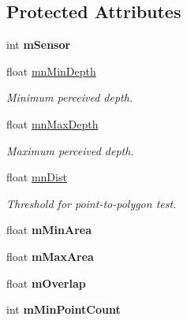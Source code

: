 \subsection*{Protected Attributes}
\begin{DoxyCompactItemize}
\item 
\mbox{\label{classEngine_a32fcfaf08165cdfc81d39e8dc8d71e6f}} 
int {\bfseries m\+Sensor}
\item 
\mbox{\label{classEngine_a7c6071c21007bd703040b035f4262da8}} 
float \hyperlink{classEngine_a7c6071c21007bd703040b035f4262da8}{mn\+Min\+Depth}
\begin{DoxyCompactList}\small\item\em Minimum perceived depth. \end{DoxyCompactList}\item 
\mbox{\label{classEngine_a639e031e36ea33902eee3bf4f2c4600f}} 
float \hyperlink{classEngine_a639e031e36ea33902eee3bf4f2c4600f}{mn\+Max\+Depth}
\begin{DoxyCompactList}\small\item\em Maximum perceived depth. \end{DoxyCompactList}\item 
\mbox{\label{classEngine_a1b1b9bc3ce76e792ae67818a36bd01bd}} 
float \hyperlink{classEngine_a1b1b9bc3ce76e792ae67818a36bd01bd}{mn\+Dist}
\begin{DoxyCompactList}\small\item\em Threshold for point-\/to-\/polygon test. \end{DoxyCompactList}\item 
\mbox{\label{classEngine_a35ddf071177f32315a8e5d534005b907}} 
float {\bfseries m\+Min\+Area}
\item 
\mbox{\label{classEngine_a470e699fd14551987d1a14e8227462e2}} 
float {\bfseries m\+Max\+Area}
\item 
\mbox{\label{classEngine_a94359672a475890b50acc354ef174417}} 
float {\bfseries m\+Overlap}
\item 
\mbox{\label{classEngine_a30a62cf18615cc5bddad798ffcc3e12a}} 
int {\bfseries m\+Min\+Point\+Count}

\end{DoxyCompactItemize}
